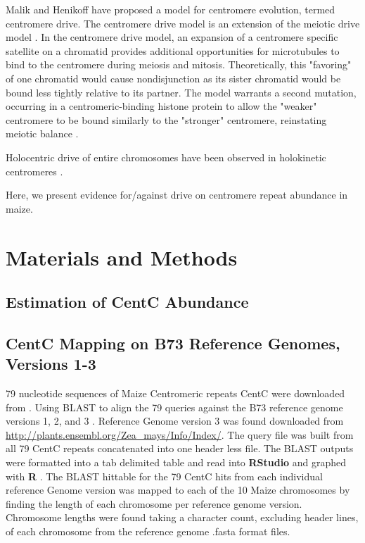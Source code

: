 \documentclass[12pt]{article}
\begin{document}
Malik and Henikoff have proposed a model for centromere evolution, termed centromere drive.  The centromere drive model is an extension of the meiotic drive model \cite{Henikoff2001}.  In the centromere drive model, an expansion of a centromere specific satellite on a chromatid provides additional opportunities for microtubules to bind to the centromere during meiosis and mitosis.  Theoretically, this "favoring" of one chromatid would cause nondisjunction as its sister chromatid would be bound less tightly relative to its partner.  The model warrants a second mutation, occurring in a centromeric-binding histone protein to allow the "weaker" centromere to be bound similarly to the "stronger" centromere, reinstating meiotic balance \cite{Henikoff2001}.      


Holocentric drive of entire chromosomes have been observed in holokinetic centromeres \cite{Bures2014}. 


Here, we present evidence for/against drive on centromere repeat abundance in maize.     

\section{Materials and Methods}

\subsection{Estimation of CentC Abundance} %

\subsection{CentC Mapping on B73 Reference Genomes, Versions 1-3} %

79 nucleotide sequences of Maize Centromeric repeats CentC were downloaded from \cite{ncbi nucleotide database}. Using BLAST to align the 79 queries against the B73 reference genome versions 1, 2, and 3 \cite{MaizeGDB} \cite{BLAST}. Reference Genome version 3 was found downloaded from  \url{http://plants.ensembl.org/Zea_mays/Info/Index/}. The query file was built from all 79 CentC repeats concatenated into one header less file. The BLAST outputs were formatted into a tab delimited table and read into {\bf RStudio} and graphed with {\bf R} \cite{R} \cite{RStudio}. The BLAST hittable for the 79 CentC hits from each individual reference Genome version was mapped to each of the 10 Maize chromosomes by finding the length of each chromosome per reference genome version. Chromosome lengths were found taking a character count, excluding header lines, of each chromosome from the reference genome .fasta format files. 
\end{document}
